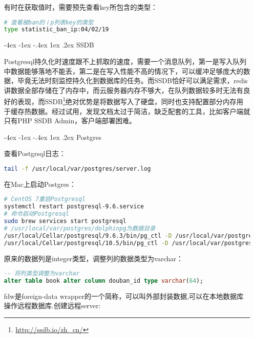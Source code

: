 \documentclass[8pt]{book}
\makeatletter
\numberwithin{dummy}{section}
\theoremstyle{ocrenumbox}
\theoremstyle{blacknumex}
\theoremstyle{blacknumbox}
\theoremstyle{ocrenum}
\renewcommand{\section}{\@startsection{section}{1}{\z@}
	{-4ex \@plus -1ex \@minus -.4ex}
	{1ex \@plus.2ex }
	{\normalfont\large\sffamily\bfseries}}
\makeatother
\begin{document}
有时在获取值时，需要预先查看key所包含的类型：

\begin{lstlisting}[language=Bash]
# 查看被ban的ｉp列表key的类型
type statistic_ban_ip:04/02/19
\end{lstlisting}


\section{SSDB}

Postgresql持久化时速度跟不上抓取的速度，需要一个消息队列，第一是写入队列中数据能够落地不能丢，第二是在写入性能不高的情况下，可以缓冲足够庞大的数据，毕竟无法时刻监控持久化到数据库的任务。而SSDB恰好可以满足需求，redis讲数据全部存储在了内存中，而云服务器内存不够大，在队列数据较多时无法有良好的表现，而SSDB\footnote{\url{http://ssdb.io/zh_cn/}}绝对优势是将数据写入了硬盘，同时也支持配置部分内存用于缓存热数据。经过试用，发现文档太过于简洁，缺乏配套的工具，比如客户端就只有PHP SSDB Admin，客户端部署困难。


\section{Postgres}

查看Postgrsql日志：

\begin{lstlisting}[language=Bash]
tail -f /usr/local/var/postgres/server.log
\end{lstlisting}

在Mac上启动Postgres：

\begin{lstlisting}[language=Bash]
# CentOS 7重启Postgresql
systemctl restart postgresql-9.6.service
# 命令启动Postgresql
sudo brew services start postgresql
# /usr/local/var/postgres/dolphinpg为数据目录
/usr/local/Cellar/postgresql/9.6.3/bin/pg_ctl -D /usr/local/var/postgres -l /usr/local/var/postgres/server.log start
/usr/local/Cellar/postgresql/10.5/bin/pg_ctl -D /usr/local/var/postgres/dolphinpg -l /usr/local/var/postgres/server.log start
\end{lstlisting}

原来的数据列是integer类型，调整列的数据类型为varchar：

\begin{lstlisting}[language=SQL]
-- 将列类型调整为varchar
alter table book alter column douban_id type varchar(64);
\end{lstlisting}

fdw是foreign-data wrapper的一个简称，可以叫外部封装数据,可以在本地数据库操作远程数据库.创建远程server:
\end{document}
